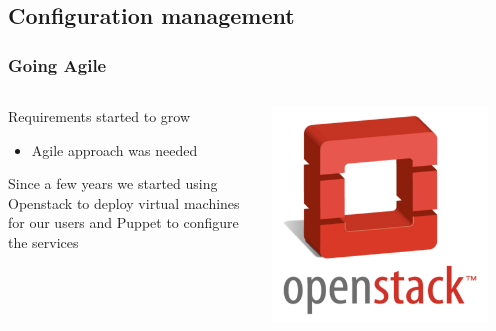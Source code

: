 \documentclass[aspectratio=169]{beamer}
\begin{document}

\subsection{Configuration management}
\begin{frame}
    \frametitle{Going Agile}
    \begin{minipage}[t]{0.95\textwidth}
        \begin{columns}
            \begin{column}{0.8\textwidth}
                Requirements started to grow
                \begin{itemize}
                    \item Agile approach was needed
                \end{itemize}
                Since a few years we started using Openstack to deploy virtual
                machines for our users and Puppet to configure the services 
            \end{column}
            \begin{column}{0.2\textwidth}
                \includegraphics[width=0.9\textwidth]{openstack-logo512.png}
            \end{column}
        \end{columns}
    \end{minipage}
    \vspace{\belowdisplayskip}

\end{frame}
\end{document}
